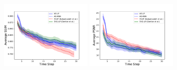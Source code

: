 \documentclass{article}
\begin{document}
\begin{figure}
  \centering
  \includegraphics[width=0.4\textwidth]{images/bair_ssim.pdf}
  \includegraphics[width=0.4\textwidth]{images/bair_psnr.pdf}
  \caption{}
  \label{bair}
\end{figure}




%
%
%
%
%
%
\end{document}
